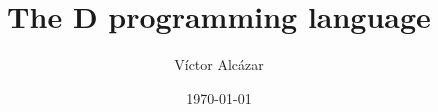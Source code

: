 

\author{Víctor Alcázar}
\title{The D programming language}
\date{\today}



\maketitle

\tableofcontents







\printbibliography[heading=bibnumbered]


